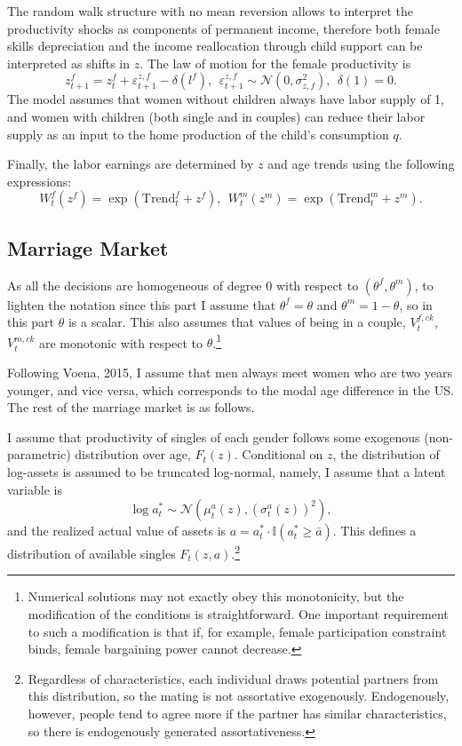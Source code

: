 \documentclass[12pt,letter]{article}
\newcommand{\I}{\mathbb{I}}
\begin{document}
The random walk structure with no mean reversion allows to interpret the productivity shocks as components of permanent income, therefore both female skills depreciation and the income reallocation through child support can be interpreted as shifts in $z$. The law of motion for the female productivity is
\begin{equation}\label{zoutlf}z^f_{t+1} = z^f_t + \varepsilon^{z,f}_{t+1} - \delta(l^f), \ \ \varepsilon^{z,f}_{t+1}\sim \mathcal{N}(0,\sigma^2_{z,f}), \ \ \delta(1) = 0.\end{equation}
The model assumes that women without children always have labor supply of 1, and women with children (both single and in couples) can reduce their labor supply as an input to the home production of the child's consumption $q$.

Finally, the labor earnings are determined by $z$ and age trends using the following expressions:
\begin{equation}\label{trends-eq}W^f_t(z^f) = \exp( \text{Trend}^f_t + z^f), \ \ W^m_t(z^m) = \exp( \text{Trend}^m_t + z^m).\end{equation}



\subsection{Marriage Market\label{marriagemarket}}
As all the decisions are homogeneous of degree 0 with respect to $(\theta^f,\theta^m)$, to lighten the notation since this part I assume that $\theta^f = \theta$ and $\theta^m = 1-\theta$, so in this part $\theta$ is a scalar. This also assumes that values of being in a couple, $V_t^{f,ck}$, $V_t^{m,ck}$ are monotonic with respect to $\theta$.\footnote{Numerical solutions may not exactly obey this monotonicity, but the modification of the conditions is straightforward. One important requirement to such a modification is that if, for example, female participation constraint binds, female bargaining power cannot decrease.}


Following Voena, 2015, I assume that men always meet women who are two years younger, and vice versa, which corresponds to the modal age difference in the US. The rest of the marriage market is as follows.

I assume that productivity of singles of each gender follows some exogenous (non-parametric) distribution over age, $F_t(z)$. Conditional on $z$, the distribution of log-assets is assumed to be truncated log-normal, namely, I assume that a latent variable is
\begin{equation}
\label{assets-partner}
\log a^*_t \sim \mathcal{N}(\mu^a_t(z),(\sigma^{a}_t(z))^2),
\end{equation}
and the realized actual value of assets is $a = a^*_t \cdot \I(a^*_t \geq \bar{a})$. This defines a distribution of available singles $F_t(z,a)$.\footnote{Regardless of characteristics, each individual draws potential partners from this distribution, so the mating is not assortative exogenously. Endogenously, however, people tend to agree more if the partner has similar characteristics, so there is endogenously generated assortativeness.}
\end{document}
